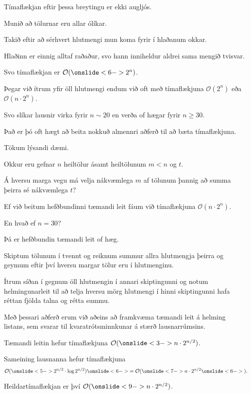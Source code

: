 {
}

{
	{
		\item<1-> Tímaflækjan eftir þessa breytingu er ekki augljós.
		\item<2-> Munið að tölurnar eru allar ólíkar.
		\item<3-> Takið eftir að sérhvert hlutmengi mun koma fyrir í hlaðanum okkar.
		\item<4-> Hlaðinn er einnig alltaf raðaður, svo hann inniheldur aldrei sama mengið tvisvar.
		\item<5-> Svo tímaflækjan er $\mathcal{O}(\onslide<6->{2^n})$.
	}
}

{
	{
		\item<1-> Þegar við ítrum yfir öll hlutmengi endum við oft með tímaflækjuna $\mathcal{O}(2^n)$ eða $\mathcal{O}(n \cdot 2^n)$.
		\item<2-> Svo slíkar lausnir virka fyrir $n \sim 20$ en verða of hægar fyrir $n \geq 30$.
		\item<3-> Það er þó oft hægt að beita nokkuð almennri aðferð til að bæta tímaflækjuna.
		\item<4-> Tökum lýsandi dæmi.
	}
}

{
	{
		\item<1-> Okkur eru gefnar $n$ heiltölur ásamt heiltölunum $m < n$ og $t$.
		\item<2-> Á hversu marga vegu má velja nákvæmlega $m$ af tölunum þannig að summa þeirra sé nákvæmlega $t$?
		\item<3-> Ef við beitum hefðbundinni tæmandi leit fáum við tímaflækjuna $\mathcal{O}(n \cdot 2^n)$.
		\item<4-> En hvað ef $n = 30$?
		\item<5-> Þá er hefðbundin tæmandi leit of hæg.
	}
}

{
	{
		\item<1-> Skiptum tölunum í tvennt og reiknum summur allra hlutmengja þeirra og geymum eftir því hversu margar tölur eru í hlutmenginu.
		\item<2-> Ítrum síðan í gegnum öll hlutmengin í annari skiptingunni
					og notum helmingunarleit til að telja hversu mörg hlutmengi í hinni skiptingunni hafa réttan fjölda talna og rétta summu.
	}
}

{
}

{
	{
		\item<1-> Með þessari aðferð erum við aðeins að framkvæma tæmandi leit á helming listans,
					sem svarar til kvaratrótsminnkunar á stærð lausnarrúmsins.
		\item<2-> Tæmandi leitin hefur tímaflækjuna $\mathcal{O}(\onslide<3->{n \cdot 2^{n/2}})$.
		\item<4-> Sameining lausnanna hefur tímaflækjuna
		\[
					\mathcal{O}(
					\onslide<5->{2^{n/2} \cdot \log 2^{n/2}}
					)
					\onslide<6->{ = \mathcal{O}(}
					\onslide<7->{n \cdot 2^{n/2}}
					\onslide<6->{).}
		\]
		\item<8-> Heildartímaflækjan er því $\mathcal{O}(\onslide<9->{n \cdot 2^{n/2}})$.
	}
}

